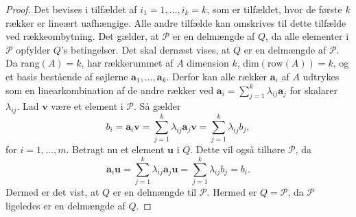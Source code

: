 \begin{proof}
Det bevises i tilfældet af $i_1=1,\ldots,i_k=k$, som er tilfældet, hvor de første $k$ rækker er lineært uafhængige. 
Alle andre tilfælde kan omskrives til dette tilfælde ved rækkeombytning. 
Det gælder, at $\mathcal{P}$ er en delmængde af $Q$, da alle elementer i $\mathcal{P}$ opfylder $Q$'s betingelser.
Det skal dernæst vises, at $Q$ er en delmængde af $\mathcal{P}$.
Da rang$(A)=k$, har rækkerummet af $A$ dimension $k$, $\text{dim}(\text{row}(A)) = k$, og et basis bestående af søjlerne $\textbf{a}_1,\ldots,\textbf{a}_k$. 
Derfor kan alle rækker $\textbf{a}_i$ af $A$ udtrykes som en linearkombination af de andre rækker ved $\textbf{a}_i=\sum^{k}_{j=1}\lambda_{ij}\textbf{a}_j$ for skalarer $\lambda_{ij}$. 
Lad $\textbf{v}$ være et element i $\mathcal{P}$. 
Så gælder
$$b_i=\textbf{a}_i\textbf{v}=\sum^{k}_{j=1}\lambda_{ij}\textbf{a}_j\textbf{v}=\sum^{k}_{j=1}\lambda_{ij}b_j,$$
for $i=1,\ldots,m.$
Betragt nu et element $\textbf{u}$ i $Q$. 
Dette vil også tilhøre $\mathcal{P}$, da
$$ \textbf{a}_i\textbf{u}=\sum^{k}_{j=1}\lambda_{ij}\textbf{a}_j\textbf{u}=\sum^{k}_{j=1}\lambda_{ij}b_j=b_i.$$
Dermed er det vist, at $Q$ er en delmængde til $\mathcal{P}$.
Hermed er $Q=\mathcal{P}$, da $\mathcal{P}$ ligeledes er en delmængde af $Q$.
\end{proof} \\